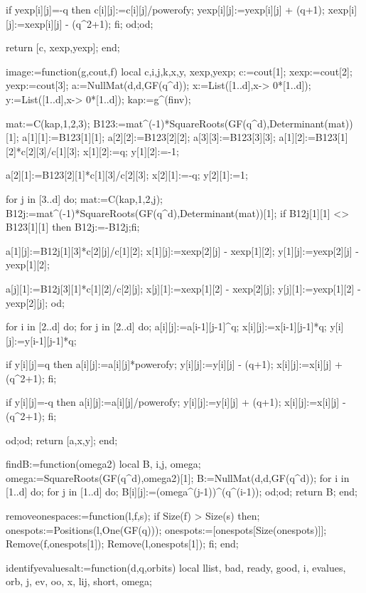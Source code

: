 if yexp[i][j]=-q then 
c[i][j]:=c[i][j]/powerofy;
yexp[i][j]:=yexp[i][j] + (q+1);
xexp[i][j]:=xexp[i][j] - (q^2+1);
fi;
od;od;

return [c, xexp,yexp];
end;


image:=function(g,cout,f) local  c,i,j,k,x,y, xexp,yexp;
c:=cout[1];
xexp:=cout[2];
yexp:=cout[3];
a:=NullMat(d,d,GF(q^d));
x:=List([1..d],x-> 0*[1..d]);
y:=List([1..d],x-> 0*[1..d]);
kap:=g^(finv);

mat:=C(kap,1,2,3);
B123:=mat^(-1)*SquareRoots(GF(q^d),Determinant(mat))[1];
a[1][1]:=B123[1][1];
a[2][2]:=B123[2][2];
a[3][3]:=B123[3][3];
a[1][2]:=B123[1][2]*c[2][3]/c[1][3];
x[1][2]:=q;
y[1][2]:=-1;

a[2][1]:=B123[2][1]*c[1][3]/c[2][3];
x[2][1]:=-q;
y[2][1]:=1;

for j in [3..d] do;
mat:=C(kap,1,2,j);
B12j:=mat^(-1)*SquareRoots(GF(q^d),Determinant(mat))[1];
if B12j[1][1] <> B123[1][1] then B12j:=-B12j;fi;

a[1][j]:=B12j[1][3]*c[2][j]/c[1][2];
x[1][j]:=xexp[2][j] - xexp[1][2];
y[1][j]:=yexp[2][j] - yexp[1][2];

a[j][1]:=B12j[3][1]*c[1][2]/c[2][j];
x[j][1]:=xexp[1][2] - xexp[2][j];
y[j][1]:=yexp[1][2] - yexp[2][j];
od;

for i in [2..d] do;
for j in [2..d] do;
a[i][j]:=a[i-1][j-1]^q;
x[i][j]:=x[i-1][j-1]*q;
y[i][j]:=y[i-1][j-1]*q;

if y[i][j]=q then 
a[i][j]:=a[i][j]*powerofy;
y[i][j]:=y[i][j] - (q+1);
x[i][j]:=x[i][j] + (q^2+1);
fi;

if y[i][j]=-q then 
a[i][j]:=a[i][j]/powerofy;
y[i][j]:=y[i][j] + (q+1);
x[i][j]:=x[i][j] - (q^2+1);
fi;



od;od;
return [a,x,y];
end;


findB:=function(omega2) local B, i,j, omega;
omega:=SquareRoots(GF(q^d),omega2)[1];
B:=NullMat(d,d,GF(q^d));
for i in [1..d] do;
for j in [1..d] do;
B[i][j]:=(omega^(j-1))^(q^(i-1));
od;od;
return B;
end;


removeonespaces:=function(l,f,s);
if Size(f) > Size(s) then;
onespots:=Positions(l,One(GF(q)));
onespots:=[onespots[Size(onespots)]];
Remove(f,onespots[1]);
Remove(l,onespots[1]);
fi;
end;

identifyevaluesalt:=function(d,q,orbits)
local llist, bad, ready, good, i, evalues, orb, j, ev, oo, x, lij, 
      short, omega;

